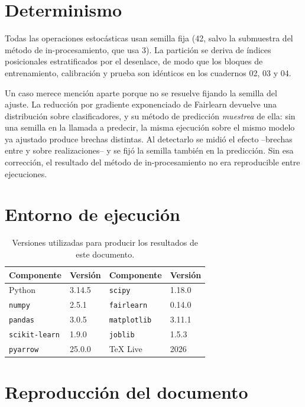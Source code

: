 \section{Determinismo}

Todas las operaciones estocásticas usan semilla fija (42, salvo la submuestra del
método de in-procesamiento, que usa 3). La partición se deriva de índices
posicionales estratificados por el desenlace, de modo que los bloques de
entrenamiento, calibración y prueba son idénticos en los cuadernos 02, 03 y 04.

Un caso merece mención aparte porque no se resuelve fijando la semilla del ajuste.
La reducción por gradiente exponenciado de Fairlearn devuelve una distribución
sobre clasificadores, y su método de predicción \emph{muestrea} de ella: sin una
semilla en la llamada a predecir, la misma ejecución sobre el mismo modelo ya
ajustado produce brechas distintas. Al detectarlo se midió el efecto --brechas
entre \inMin{} y \inMax{} sobre \inRealizaciones{} realizaciones-- y se fijó la
semilla también en la predicción. Sin esa corrección, el resultado del método de
in-procesamiento no era reproducible entre ejecuciones.

\section{Entorno de ejecución}

\begin{table}[htbp]
\centering
\caption{Versiones utilizadas para producir los resultados de este documento.}
\label{tab:entorno}
\small
\begin{tabular}{l l l l}
\toprule
Componente & Versión & Componente & Versión \\
\midrule
Python        & 3.14.5  & \texttt{scipy}       & 1.18.0 \\
\texttt{numpy}        & 2.5.1   & \texttt{fairlearn}   & 0.14.0 \\
\texttt{pandas}       & 3.0.5   & \texttt{matplotlib}  & 3.11.1 \\
\texttt{scikit-learn} & 1.9.0   & \texttt{joblib}      & 1.5.3 \\
\texttt{pyarrow}      & 25.0.0  & \TeX{} Live          & 2026 \\
\bottomrule
\end{tabular}
\end{table}

\section{Reproducción del documento}


